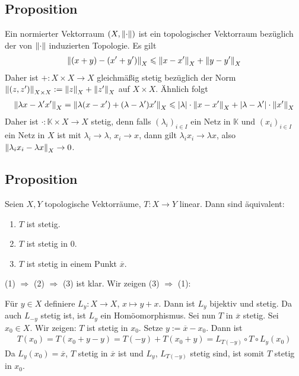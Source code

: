 \subsection[Proposition: Normierte Vektorräume sind topologische Vektorräume]{Proposition} %
\label{sub:23}
Ein normierter Vektorraum $(X, \norm{\cdot})$ ist ein topologischer Vektorraum bezüglich der von $\norm{\cdot}$ induzierten Topologie.
Es gilt 
\begin{align*}
	\norm[X]{(x+y) - (x'+y')} \le \norm[X]{x-x'} + \norm[X]{y-y'}   
\end{align*}
Daher ist $+ : X \times X \to X$ gleichmäßig stetig bezüglich der Norm $\norm[X \times X]{(z,z')} := \norm[X]{z} + \norm[X]{z'}$ auf $X \times X$. Ähnlich folgt
\begin{align*}
	\norm[X]{\lambda x - \lambda' x'} = \norm[X]{\lambda (x-x') + (\lambda -\lambda')x'} \le \abs*{\lambda } \cdot \norm[X]{x-x'} + \abs*{\lambda -\lambda'} \cdot 
	\norm[X]{x'}      
\end{align*}
Daher ist $\cdot : \mathds{K} \times X \to X$ stetig, denn falls $(\lambda_i)_{i \in I}$ ein Netz in $\mathds{K}$ und $(x_i)_{i \in I}$ ein Netz in $X$ ist mit 
$\lambda_i \to \lambda $, $x_i\to x$, dann  gilt $\lambda_i x_i \to \lambda x$, also $\norm[X]{\lambda_i x_i - \lambda x} \to 0$. \bewende

\subsection[Proposition: Stetigkeit einer linearen Abbildung zwischen topologischen Vektorräumen]{Proposition} %
\label{sub:24}
Seien $X,Y$ topologische Vektorräume, $T : X \to Y$ linear. Dann sind äquivalent:
\begin{enumerate}[(1)]
	\item $T$ ist stetig.
	\item $T$ ist stetig in $0$.
	\item $T$ ist stetig in einem Punkt $\overline{x}$.
\end{enumerate}
(1) $\Rightarrow$ (2) $\Rightarrow $ (3) ist klar. Wir zeigen (3) $\Rightarrow$ (1):

Für $y \in X$ definiere $L_y : X \to X$, $x \mapsto y+ x$. Dann ist $L_y$ bijektiv und stetig. Da auch $L_{-y}$ stetig ist, ist $L_y$ ein Homöomorphismus. Sei nun $T$ in 
$\overline{x}$ stetig. Sei $x_0 \in X$. Wir zeigen: $T$ ist stetig in $x_0$. Setze $y := \overline{x} - x_0$. Dann ist
\begin{align*}
	T(x_0) = T(x_0+y-y) = T(-y) + T(x_0+y) = L_{T(-y)} \circ T \circ L_y (x_0)
\end{align*}
Da $L_y(x_0) = \overline{x}$, $T$ stetig in $\overline{x}$ ist und $L_y$, $L_{T(-y)}$ stetig sind, ist somit $T$ stetig in $x_0$. \bewende


